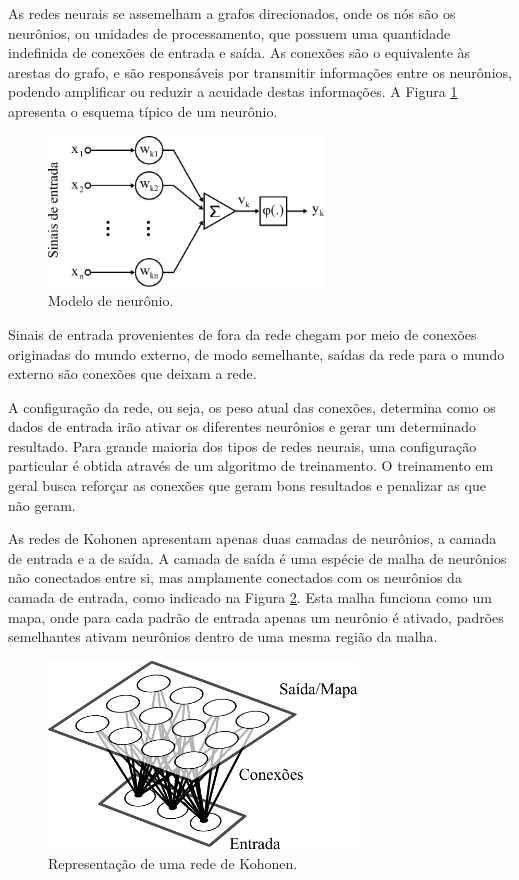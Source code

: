 As redes neurais se assemelham a grafos direcionados, onde os nós são os
neurônios, ou unidades de processamento, que possuem uma quantidade indefinida
de conexões de entrada e saída. As conexões são o equivalente às arestas do
grafo, e são responsáveis por transmitir informações entre os neurônios, podendo
amplificar ou reduzir a acuidade destas informações. A Figura \ref{fig:neuronio}
apresenta o esquema típico de um neurônio.

\begin{figure}[H]
  \begin{center}
    \includegraphics[height=4cm]{imagens/neuronio.pdf}
  \end{center}
  \caption{ Modelo de neurônio. }
  \label{fig:neuronio}
\end{figure}

Sinais de entrada provenientes de fora da rede chegam por meio de conexões
originadas do mundo externo, de modo semelhante, saídas da rede para o mundo
externo são conexões que deixam a rede.

A configuração da rede, ou seja, os peso atual das conexões, determina como os
dados de entrada irão ativar os diferentes neurônios e gerar um determinado
resultado. Para grande maioria dos tipos de redes neurais, uma configuração
particular é obtida através de um algoritmo de treinamento. O treinamento em
geral busca reforçar as conexões que geram bons resultados e penalizar as que
não geram.

As redes de Kohonen apresentam apenas duas camadas de neurônios, a camada de
entrada e a de saída. A camada de saída é uma espécie de malha de neurônios não
conectados entre si, mas amplamente conectados com os neurônios da camada de
entrada, como indicado na Figura \ref{fig:kohonen}. Esta malha funciona como um
mapa, onde para cada padrão de entrada
apenas um neurônio é ativado, padrões semelhantes ativam neurônios dentro de
uma mesma região da malha.

\begin{figure}[H]
  \begin{center}
    \includegraphics[height=5cm]{imagens/kohonen.pdf}
  \end{center}
  \caption{ Representação de uma rede de Kohonen. }
  \label{fig:kohonen}
\end{figure}

